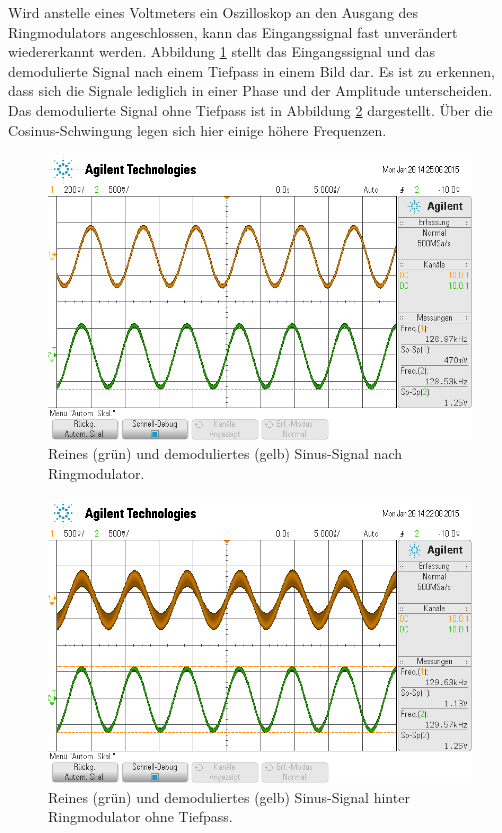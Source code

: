 Wird anstelle eines Voltmeters ein Oszilloskop an den Ausgang des
Ringmodulators angeschlossen, kann das Eingangssignal fast unverändert
wiedererkannt werden.
Abbildung \ref{fig:am-demoduliert} stellt das Eingangssignal und das
demodulierte Signal nach einem Tiefpass in einem Bild dar.
Es ist zu erkennen, dass sich die Signale lediglich in einer Phase
und der Amplitude unterscheiden.
Das demodulierte Signal ohne Tiefpass ist in Abbildung \ref{fig:am-kein-tp}
dargestellt. Über die Cosinus-Schwingung legen sich hier einige höhere
Frequenzen.
\begin{figure}
    \centering
    \includegraphics[width=0.8\linewidth]{images/am-demoduliert.png}
    \caption{Reines (grün) und demoduliertes (gelb) Sinus-Signal nach
    Ringmodulator.}
    \label{fig:am-demoduliert}
\end{figure}
\begin{figure}
    \centering
    \includegraphics[width=0.8\linewidth]{images/am-kein-tp.png}
    \caption{Reines (grün) und demoduliertes (gelb) Sinus-Signal hinter
    Ringmodulator ohne Tiefpass.}
    \label{fig:am-kein-tp}
\end{figure}
